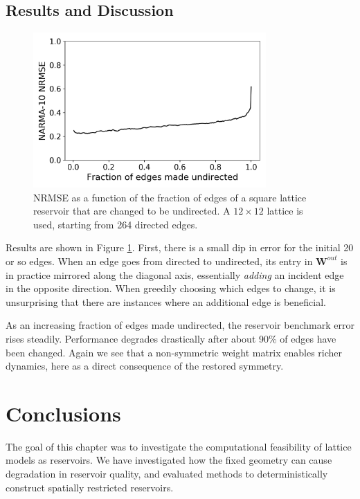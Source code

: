 \subsection{Results and Discussion}

\begin{figure}[htb]
  \centering
  \includegraphics[width=3.5in]{figures/undir-performance.png}
  \caption{
    NRMSE as a function of the fraction of edges of a square lattice reservoir
that are changed to be undirected. A $12 \times 12$ lattice is used, starting
from 264 directed edges.
  }
  \label{fig:undirection-performance}
\end{figure}

Results are shown in Figure \ref{fig:undirection-performance}. First, there is a
small dip in error for the initial 20 or so edges. When an edge goes from
directed to undirected, its entry in $\mathbf{W}^{out}$ is in practice mirrored
along the diagonal axis, essentially \textit{adding} an incident edge in the
opposite direction. When greedily choosing which edges to change, it is
unsurprising that there are instances where an additional edge is beneficial.

As an increasing fraction of edges made undirected, the reservoir benchmark
error rises steadily. Performance degrades drastically after about 90\% of edges
have been changed. Again we see that a non-symmetric weight matrix enables
richer dynamics, here as a direct consequence of the restored symmetry.

\section{Conclusions}

The goal of this chapter was to investigate the computational feasibility of
lattice models as reservoirs. We have investigated how the fixed geometry can
cause degradation in reservoir quality, and evaluated methods to
deterministically construct spatially restricted reservoirs.

